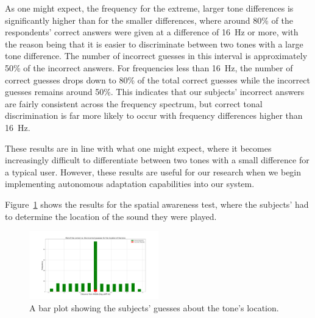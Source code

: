 \documentclass[format=sigconf, review=true, screen=true, anonymous=true]{acmart}
\begin{document}
As one might expect, the frequency for the extreme, larger tone differences is significantly higher than for the smaller differences, where around 80\% of the respondents' correct answers were given at a difference of \SI{16}{\hertz} or more, with the reason being that it is easier to discriminate between two tones with a large tone difference. The number of incorrect guesses in this interval is approximately 50\% of the incorrect answers. For frequencies less than \SI{16}{\hertz}, the number of correct guesses drops down to 80\% of the total correct guesses while the incorrect guesses remains around 50\%. This indicates that our subjects' incorrect answers are fairly consistent across the frequency spectrum, but correct tonal discrimination is far more likely to occur with frequency differences higher than \SI{16}{\hertz}.  

These results are in line with what one might expect, where it becomes increasingly difficult to differentiate between two tones with a small difference for a typical user. However, these results are useful for our research when we begin implementing autonomous adaptation capabilities into our system. 



Figure~\ref{fig:location-guesses} shows the results for the spatial awareness test, where the subjects' had to determine the location of the sound they were played. 

\begin{figure}
  \centering
  \includegraphics[width=0.5\textwidth]{figures/location_guesses.png}
  \caption{A bar plot showing the subjects' guesses about the tone's location.}
  \label{fig:location-guesses}
\end{figure}
\end{document}
